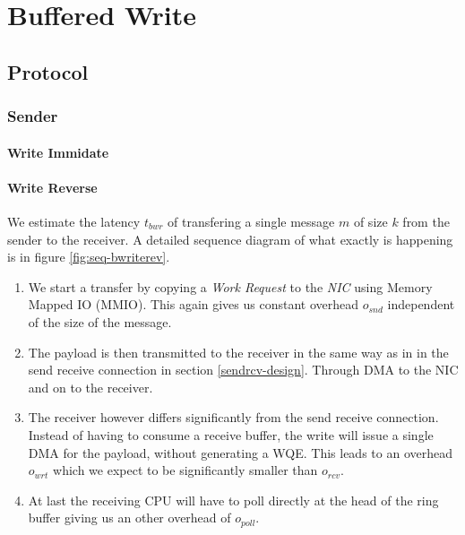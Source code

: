 
\section{Buffered Write} \label{sec:conn:buf_write}


\subsection{Protocol}
\subsubsection{Sender}
\paragraph{Write Immidate}


\paragraph{Write Reverse}

We estimate the latency $t_{bwr}$ of transfering a single message $m$ of size $k$ from the sender to the receiver. 
A detailed sequence diagram of what exactly is happening is in figure \ref{fig:seq-bwriterev}. 

\begin{enumerate}
  \item We start a transfer by copying a \emph{Work Request} to the \emph{NIC} using Memory Mapped IO (MMIO). This again gives
    us constant overhead $o_{snd}$ independent of the size of the message.
  \item The payload is then transmitted to the receiver in the same way as in in the send receive connection in section 
    \ref{sendrcv-design}. Through DMA to the NIC and on to the receiver.
  \item The receiver however differs significantly from the send receive connection. Instead of having to consume a receive buffer,
    the write will issue a single DMA for the payload, without generating a WQE. This leads to an overhead $o_{wrt}$ which we
    expect to be significantly smaller than $o_{rcv}$.
  \item At last the receiving CPU will have to poll directly at the head of the ring buffer giving us an other overhead of $o_{poll}$.
\end{enumerate}



